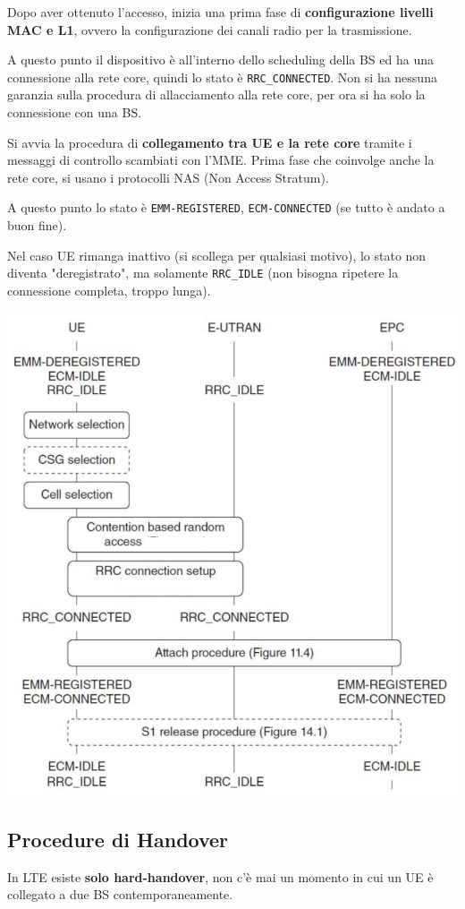 Dopo aver ottenuto l'accesso, inizia una prima fase di \textbf{configurazione livelli MAC e L1}, ovvero la configurazione dei canali radio per la trasmissione.

A questo punto il dispositivo è all'interno dello scheduling della BS ed ha una connessione alla rete core, quindi lo stato è \texttt{RRC\_CONNECTED}. Non si ha nessuna garanzia sulla procedura di allacciamento alla rete core, per ora si ha solo la connessione con una BS.

Si avvia la procedura di \textbf{collegamento tra UE e la rete core} tramite i messaggi di controllo scambiati con l'MME. Prima fase che coinvolge anche la rete core, si usano i protocolli NAS (Non Access Stratum).

A questo punto lo stato è \texttt{EMM-REGISTERED}, \texttt{ECM-CONNECTED} (se tutto è andato a buon fine).

Nel caso UE rimanga inattivo (si scollega per qualsiasi motivo), lo stato non diventa "deregistrato", ma solamente \texttt{RRC\_IDLE} (non bisogna ripetere la connessione completa, troppo lunga).

\begin{center}
	\includegraphics[width=0.75\linewidth]{img/4g/collop}
\end{center}

\subsection{Procedure di Handover}

In LTE esiste \textbf{solo hard-handover}, non c'è mai un momento in cui un UE è collegato a due BS contemporaneamente.


